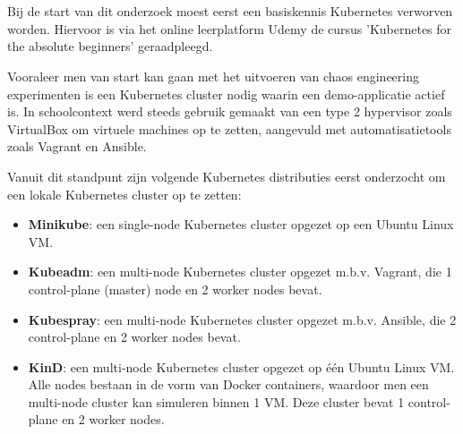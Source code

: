
\chapter{}
\label{ch:methodologie}


Bij de start van dit onderzoek moest eerst een basiskennis Kubernetes verworven worden. Hiervoor is via het online leerplatform Udemy de cursus 'Kubernetes for the absolute beginners' geraadpleegd. \autocite{Mannambeth2021}  

Vooraleer men van start kan gaan met het uitvoeren van chaos engineering experimenten is een Kubernetes cluster nodig waarin een demo-applicatie actief is. In schoolcontext werd steeds gebruik gemaakt van een type 2 hypervisor zoals VirtualBox om virtuele machines op te zetten, aangevuld met automatisatietools zoals Vagrant en Ansible. 

Vanuit dit standpunt zijn volgende Kubernetes distributies eerst onderzocht om een lokale Kubernetes cluster op te zetten:
 
\begin{itemize}
    \item {\bf Minikube}: een single-node Kubernetes cluster opgezet op een Ubuntu Linux VM. 
    \item {\bf Kubeadm}: een multi-node Kubernetes cluster opgezet m.b.v. Vagrant, die 1 control-plane (master) node en 2 worker nodes bevat.
    \item {\bf Kubespray}: een multi-node Kubernetes cluster opgezet m.b.v. Ansible, die 2 control-plane en 2 worker nodes bevat.  
    \item {\bf KinD}: een multi-node Kubernetes cluster opgezet op één Ubuntu Linux VM. Alle nodes bestaan in de vorm van Docker containers, waardoor men een multi-node cluster kan simuleren binnen 1 VM. Deze cluster bevat 1 control-plane en 2 worker nodes.
\end{itemize}

